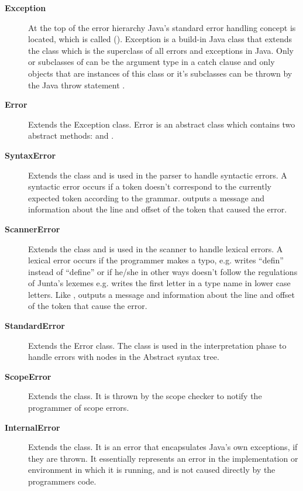\begin{description}
\item[\textbf{Exception}] At the top of the error hierarchy Java's standard
  error handling concept is located, which is called 
  (). Exception is a build-in Java class that
  extends the  class which is the superclass of all errors
  and exceptions in Java.  Only  or subclasses of
   can be the argument type in a catch clause and only
  objects that are instances of this class or it's subclasses can be thrown by
  the Java throw statement \cite{throwable}.

\item[\textbf{Error}] Extends the Exception class. Error is an abstract class
  which contains two abstract methods:  and
  .

\item[\textbf{SyntaxError}] Extends the  class and is used in
  the parser to handle syntactic errors. A syntactic error occurs if a token
  doesn't correspond to the currently expected token according to the grammar.
   outputs a message and information about the line and
  offset of the token that caused the error. 

\item[\textbf{ScannerError}] Extends the  class and is
  used in the scanner to handle lexical errors. A lexical error occurs if the
  programmer makes a typo, e.g. writes ``defin'' instead of ``define'' or if
  he/she in other ways doesn't follow the regulations of Junta's lexemes e.g.
  writes the first letter in a type name in lower case letters. Like
  ,  outputs a message and
  information about the line and offset of the token that cause the error.  

\item[\textbf{StandardError}] Extends the Error class. The
   class is used in the interpretation phase to handle
  errors with nodes in the Abstract syntax tree.  

\item[\textbf{ScopeError}] Extends the  class. It is
  thrown by the scope checker to notify the programmer of scope errors.

\item[\textbf{InternalError}] Extends the  class. It is
  an error that encapsulates Java's own exceptions, if they are thrown. It
  essentially represents an error in the implementation or environment in which
  it is running, and is not caused directly by the programmers code.


\end{description}
